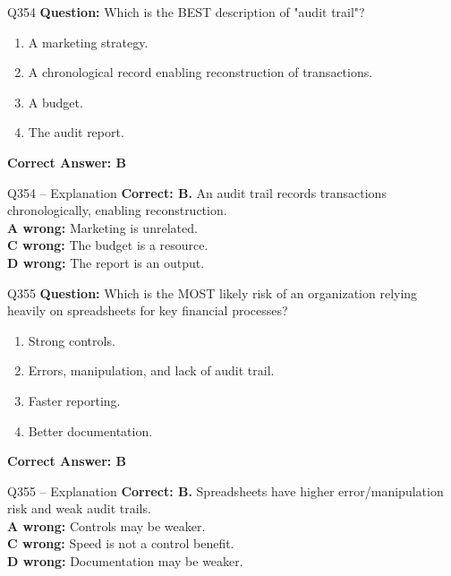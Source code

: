 \documentclass[aspectratio=169,10pt]{beamer}
\begin{document}
	\begin{frame}[t]{Q354}
		\small
		\textbf{Question:} Which is the BEST description of "audit trail"?
		\begin{enumerate}[label=\Alph*.,itemsep=1pt,topsep=2pt]
			\item A marketing strategy.
			\item A chronological record enabling reconstruction of transactions.
			\item A budget.
			\item The audit report.
		\end{enumerate}
		\vspace{4pt}
		\textbf{Correct Answer: B}
	\end{frame}
	
	\begin{frame}[t]{Q354 -- Explanation}
		\small
		\textbf{Correct: B.} An audit trail records transactions chronologically, enabling reconstruction. \\[4pt]
		\textbf{A wrong:} Marketing is unrelated. \\[2pt]
		\textbf{C wrong:} The budget is a resource. \\[2pt]
		\textbf{D wrong:} The report is an output.
	\end{frame}
	
	\begin{frame}[t]{Q355}
		\small
		\textbf{Question:} Which is the MOST likely risk of an organization relying heavily on spreadsheets for key financial processes?
		\begin{enumerate}[label=\Alph*.,itemsep=1pt,topsep=2pt]
			\item Strong controls.
			\item Errors, manipulation, and lack of audit trail.
			\item Faster reporting.
			\item Better documentation.
		\end{enumerate}
		\vspace{4pt}
		\textbf{Correct Answer: B}
	\end{frame}
	
	\begin{frame}[t]{Q355 -- Explanation}
		\small
		\textbf{Correct: B.} Spreadsheets have higher error/manipulation risk and weak audit trails. \\[4pt]
		\textbf{A wrong:} Controls may be weaker. \\[2pt]
		\textbf{C wrong:} Speed is not a control benefit. \\[2pt]
		\textbf{D wrong:} Documentation may be weaker.
	\end{frame}
	
\end{document}

